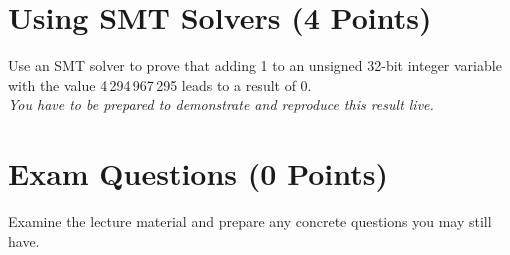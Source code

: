 \documentclass[a4paper]{article}
\begin{document}
\section{Using SMT Solvers (4 Points)}

Use an SMT solver to prove that adding 1 to an unsigned 32-bit integer variable with the value 4\,294\,967\,295 leads to a result of 0.\\
\textit{You have to be prepared to demonstrate and reproduce this result live.}


\section{Exam Questions (0 Points)}

Examine the lecture material and prepare any concrete questions you may still have.
\end{document}
